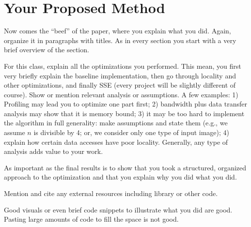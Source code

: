 \section{Your Proposed Method}\label{sec:yourmethod}

Now comes the ``beef'' of the paper, where you explain what you
did. Again, organize it in paragraphs with titles. As in every section
you start with a very brief overview of the section.

For this class, explain all the optimizations you performed. This mean, you first very briefly
explain the baseline implementation, then go through locality and other optimizations, and finally SSE (every project will be slightly different of course). Show or mention relevant analysis or assumptions. A few examples: 1) Profiling may lead you to optimize one part first; 2) bandwidth plus data transfer analysis may show that it is memory bound; 3) it may be too hard to implement the algorithm in full generality: make assumptions and state them (e.g., we assume $n$ is divisible by 4; or, we consider only one type of input image); 4) explain how certain data accesses have poor locality. Generally, any type of analysis adds value to your work.

As important as the final results is to show that you took a structured, organized approach to the optimization and that you explain why you did what you did.

Mention and cite any external resources including library or other code.

Good visuals or even brief code snippets to illustrate what you did are good. Pasting large amounts of code to fill the space is not good.
